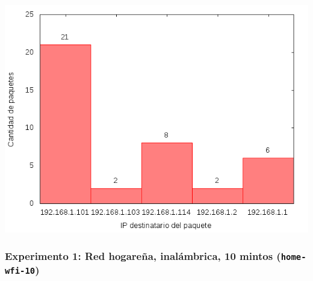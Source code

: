 \includegraphics{../mediciones/home-eth-10/home-eth-10IpsDstArp.png}

\subsubsection{Experimento 1: Red hogareña, inalámbrica, 10 mintos (\texttt{home-wfi-10})}

